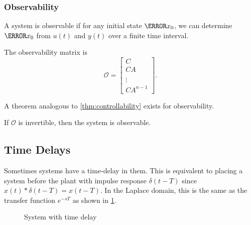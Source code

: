 \subsubsection{Observability}
\begin{definition}
  A system is observable if for any initial state $\V{x}_0$, we can determine $\V{x}_0$ from $u(t)$ and $y(t)$ over a finite time interval.
  \label{defn:observability}
\end{definition}
\begin{definition}
  The observability matrix is
  \[
	\mathcal{O} = \begin{bmatrix} C \\ CA \\ \\ \vdots \\ CA^{n-1} \end{bmatrix}.
  \]
  \label{defn:observability-matrix}
\end{definition}
A theorem analogous to \cref{thm:controllability} exists for observability.
\begin{theorem}
  If $\mathcal{O}$ is invertible, then the system is observable.
  \label{thm:observability}
\end{theorem}
\subsection{Time Delays}
Sometimes systems have a time-delay in them. This is equivalent to placing a system before the plant with impulse response $\delta(t-T)$ since $x(t)*\delta(t-T) = x(t-T)$.
In the Laplace domain, this is the same as the transfer function $e^{-sT}$ as shown in \cref{fig:time-delay}.
\begin{gitbook-image}
\begin{figure}[H]
    \centering 
    \caption{System with time delay}
    \label{fig:time-delay}
\end{figure}
\end{gitbook-image}
